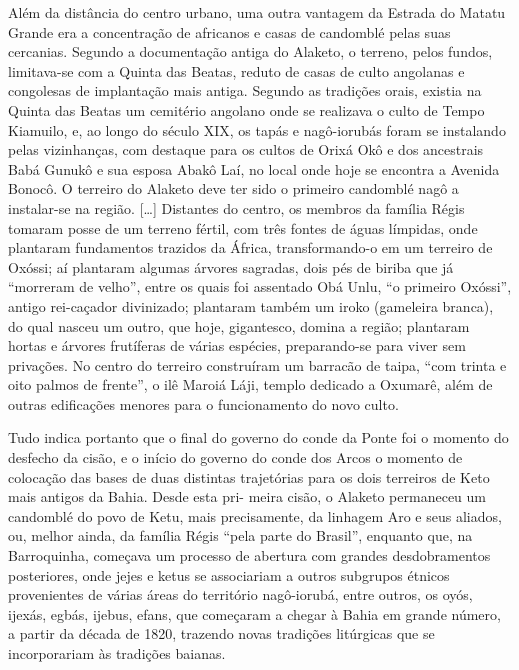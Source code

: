 \begin{citacao}
Além da distância do centro urbano, uma outra vantagem da Estrada do Matatu Grande era a concentração de africanos e casas de candomblé pelas suas cercanias. Segundo a documentação antiga do Alaketo, o terreno, pelos fundos, limitava-se com a Quinta das Beatas, reduto de casas de culto angolanas e congolesas de implantação mais antiga. Segundo as tradições orais, existia na Quinta das Beatas um cemitério angolano onde se realizava o culto de Tempo Kiamuilo, e, ao longo do século XIX, os tapás e nagô-iorubás foram se instalando pelas vizinhanças, com destaque para os cultos de Orixá Okô e dos ancestrais Babá Gunukô e sua esposa Abakô Laí, no local onde hoje se encontra a Avenida Bonocô. O terreiro do Alaketo deve ter sido o primeiro candomblé nagô a instalar-se na região. [\dots] Distantes do centro, os membros da família Régis tomaram posse de um terreno fértil, com três fontes de águas límpidas, onde plantaram fundamentos trazidos da África, transformando-o em um terreiro de Oxóssi; aí plantaram algumas árvores sagradas, dois pés de biriba que já “morreram de velho”, entre os quais foi assentado Obá Unlu, “o primeiro Oxóssi”, antigo rei-caçador divinizado; plantaram também um iroko (gameleira branca), do qual nasceu um outro, que hoje, gigantesco, domina a região; plantaram hortas e árvores frutíferas de várias espécies, preparando-se para viver sem privações. No centro do terreiro construíram um barracão de taipa, ``com trinta e oito palmos de frente'', o ilê Maroiá Láji, templo dedicado a Oxumarê, além de outras edificações menores para o funcionamento do novo culto.

Tudo indica portanto que o final do governo do conde da Ponte foi o momento do desfecho da cisão, e o início do governo do conde dos Arcos o momento de colocação das bases de duas distintas trajetórias para os dois terreiros de Keto mais antigos da Bahia. Desde esta pri-
meira cisão, o Alaketo permaneceu um candomblé do povo de Ketu, mais precisamente, da linhagem Aro e seus aliados, ou, melhor ainda, da família Régis “pela parte do Brasil”, enquanto que, na Barroquinha, começava um processo de abertura com grandes desdobramentos posteriores, onde jejes e ketus se associariam a outros subgrupos étnicos provenientes de várias áreas do território nagô-iorubá, entre outros, os oyós, ijexás, egbás, ijebus, efans, que começaram a chegar à Bahia em grande número, a partir da década de 1820, trazendo novas tradições litúrgicas que se incorporariam às tradições baianas.


\end{citacao}
